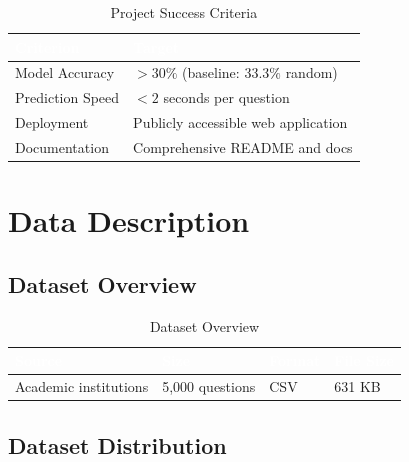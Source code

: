 \documentclass[12pt,a4paper]{article}
\begin{document}
\begin{table}[H]
\centering
\begin{tabular}{|L{4cm}|L{8cm}|}
\hline
{}
\textcolor{white}{\textbf{Criterion}} & \textcolor{white}{\textbf{Target}} \\
\hline
Model Accuracy        & $>30\%$ (baseline: $33.3\%$ random) \\
\hline
{}
Prediction Speed      & $<2$ seconds per question \\
\hline
Deployment            & Publicly accessible web application \\
\hline
{}
Documentation         & Comprehensive README and docs \\
\hline
\end{tabular}
\caption{Project Success Criteria}
\end{table}

\section{Data Description}

\subsection{Dataset Overview}

\begin{table}[H]
\centering
\begin{tabular}{|C{3cm}|C{3cm}|C{3cm}|C{3cm}|}
\hline
{}
\textcolor{white}{\textbf{Source}} &
\textcolor{white}{\textbf{Size}} &
\textcolor{white}{\textbf{Format}} &
\textcolor{white}{\textbf{File Size}} \\
\hline
Academic institutions & 5,000 questions & CSV & 631 KB \\
\hline
\end{tabular}
\caption{Dataset Overview}
\end{table}

\subsection{Dataset Distribution}
\end{document}
